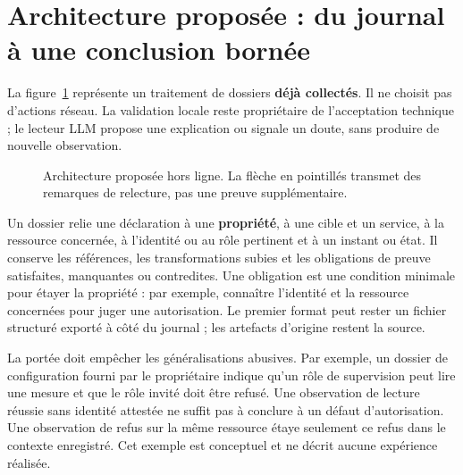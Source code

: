 \documentclass[11pt,a4paper]{article}
\begin{document}
\section{Architecture proposée : du journal à une conclusion bornée}
La figure~\ref{fig:architecture} représente un traitement de dossiers
\textbf{déjà collectés}. Il ne choisit pas d'actions réseau. La validation
locale reste propriétaire de l'acceptation technique ; le lecteur LLM propose
une explication ou signale un doute, sans produire de nouvelle observation.

\begin{figure}[htbp]
\centering
{}
\caption{Architecture proposée hors ligne. La flèche en pointillés transmet
des remarques de relecture, pas une preuve supplémentaire.}
\label{fig:architecture}
\end{figure}

Un dossier relie une déclaration à une \textbf{propriété}, à une cible et un
service, à la ressource concernée, à l'identité ou au rôle pertinent et à un
instant ou état. Il conserve les références, les transformations subies et
les obligations de preuve satisfaites, manquantes ou contredites. Une obligation
est une condition minimale pour étayer la propriété : par exemple, connaître
l'identité et la ressource concernées pour juger une autorisation. Le premier
format peut rester un fichier structuré exporté à côté du journal ; les
artefacts d'origine restent la source.

La portée doit empêcher les généralisations abusives. Par exemple, un dossier
de configuration fourni par le propriétaire indique qu'un rôle de supervision
peut lire une mesure et que le rôle invité doit être refusé. Une observation
de lecture réussie sans identité attestée ne suffit pas à conclure à un défaut
d'autorisation. Une observation de refus sur la même ressource étaye seulement
ce refus dans le contexte enregistré. Cet exemple est conceptuel et ne décrit
aucune expérience réalisée.
\end{document}
